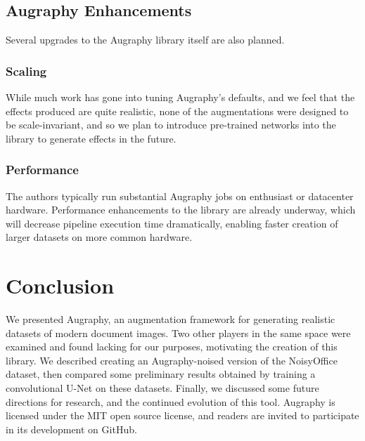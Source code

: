 \documentclass[runningheads]{llncs}
\begin{document}
\subsection{Augraphy Enhancements}
Several upgrades to the Augraphy library itself are also planned.

\subsubsection{Scaling}
While much work has gone into tuning Augraphy's defaults, and we feel that the effects produced are quite realistic, none of the augmentations were designed to be scale-invariant, and so we plan to introduce pre-trained networks into the library to generate effects in the future.

\subsubsection{Performance}
The authors typically run substantial Augraphy jobs on enthusiast or datacenter hardware. Performance enhancements to the library are already underway, which will decrease pipeline execution time dramatically, enabling faster creation of larger datasets on more common hardware.

\section{Conclusion}
We presented Augraphy, an augmentation framework for generating realistic datasets of modern document images. Two other players in the same space were examined and found lacking for our purposes, motivating the creation of this library. We described creating an Augraphy-noised version of the NoisyOffice dataset, then compared some preliminary results obtained by training a convolutional U-Net on these datasets. Finally, we discussed some future directions for research, and the continued evolution of this tool. Augraphy is licensed under the MIT open source license, and readers are invited to participate in its development on GitHub.
\end{document}
